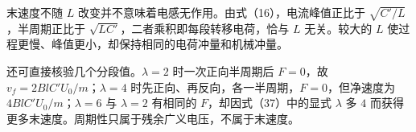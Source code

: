 \documentclass[12pt,a4paper,UTF8]{ctexart}
\begin{document}
末速度不随 \(L\) 改变并不意味着电感无作用。由式（16），电流峰值正比于
\(\sqrt{C'/L}\)，半周期正比于
\(\sqrt{LC'}\)，二者乘积即每段转移电荷，恰与 \(L\) 无关。较大的 \(L\)
使过程更慢、峰值更小，却保持相同的电荷冲量和机械冲量。

还可直接核验几个分段值。\(\lambda=2\) 时一次正向半周期后 \(F=0\)，故
\(v_f=2BlC'U_0/m\)；\(\lambda=4\)
时先正向、再反向，各一半周期，\(F=0\)，但净速度为
\(4BlC'U_0/m\)；\(\lambda=6\) 与 \(\lambda=2\) 有相同的
\(F\)，却因式（37）中的显式 \(\lambda\) 多 \(4\)
而获得更多末速度。周期性只属于残余广义电压，不属于末速度。
\end{document}
